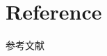 \documentclass{beamer}%
\begin{document}
\section{Reference}

\begin{frame}[allowframebreaks]{参考文献}
    \vspace{-0.3cm}
    \scriptsize%
    \normalem
\end{frame}
\end{document}
